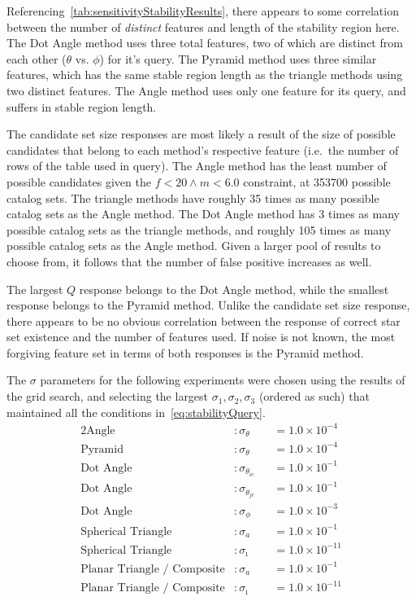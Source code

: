 Referencing~\autoref{tab:sensitivityStabilityResults}, there appears to some correlation between the number of
\textit{distinct} features and length of the stability region here.
The Dot Angle method uses three total features, two of which are distinct from each other ($\theta$ vs. $\phi$) for
it's query.
The Pyramid method uses three similar features, which has the same stable region length as the triangle methods
using two distinct features.
The Angle method uses only one feature for its query, and suffers in stable region length.

The candidate set size responses are most likely a result of the size of possible candidates that belong to each
method's respective feature (i.e.\ the number of rows of the table used in query).
The Angle method has the least number of possible candidates given the $f < 20 \land m < 6.0$ constraint, at 353700
possible catalog sets.
The triangle methods have roughly 35 times as many possible catalog sets as the Angle method.
The Dot Angle method has 3 times as many possible catalog sets as the triangle methods, and roughly 105 times as many
possible catalog sets as the Angle method.
Given a larger pool of results to choose from, it follows that the number of false positive increases as well.

The largest $Q$ response belongs to the Dot Angle method, while the smallest response belongs to the Pyramid method.
Unlike the candidate set size response, there appears to be no obvious correlation between the response of correct
star set existence and the number of features used.
If noise is not known, the most forgiving feature set in terms of both responses is the Pyramid method.

The $\sigma$ parameters for the following experiments were chosen using the results of the grid search, and selecting
the largest $\sigma_1, \sigma_2, \sigma_3$ (ordered as such) that maintained all the
conditions in~\autoref{eq:stabilityQuery}.
\begin{alignat*}{2}
    \text{Angle}&: \sigma_\theta &&= 1.0 \times 10^{-4}\\
    \text{Pyramid}&: \sigma_\theta &&= 1.0 \times 10^{-4}\\
    \text{Dot Angle}&: \sigma_{\theta_{ic}} &&= 1.0 \times 10^{-1}\\
    \text{Dot Angle}&: \sigma_{\theta_{jc}} &&= 1.0 \times 10^{-1}\\
    \text{Dot Angle}&: \sigma_\phi &&= 1.0 \times 10^{-3} \\
    \text{Spherical Triangle}&: \sigma_a &&= 1.0 \times 10^{-1}\\
    \text{Spherical Triangle}&: \sigma_\imath &&= 1.0 \times 10^{-11}\\
    \text{Planar Triangle / Composite}&: \sigma_a &&= 1.0 \times 10^{-1} \\
    \text{Planar Triangle / Composite}&: \sigma_\imath &&= 1.0 \times 10^{-11}\\
\end{alignat*}

